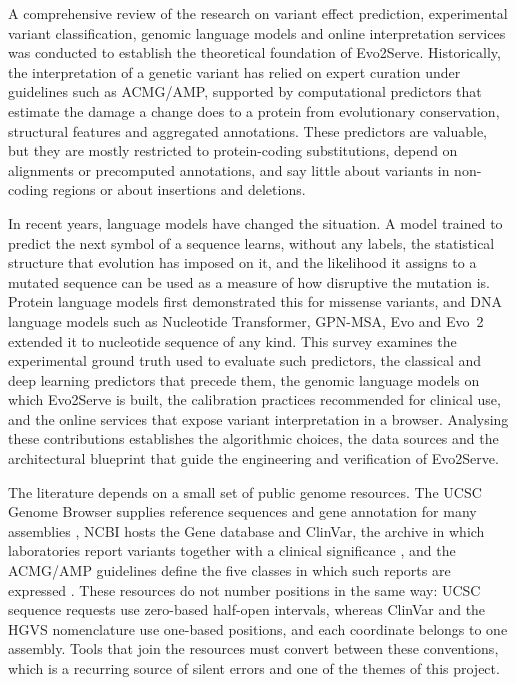 A comprehensive review of the research on variant effect prediction, experimental variant classification, genomic language models and online interpretation services was conducted to establish the theoretical foundation of Evo2Serve. Historically, the interpretation of a genetic variant has relied on expert curation under guidelines such as ACMG/AMP, supported by computational predictors that estimate the damage a change does to a protein from evolutionary conservation, structural features and aggregated annotations. These predictors are valuable, but they are mostly restricted to protein-coding substitutions, depend on alignments or precomputed annotations, and say little about variants in non-coding regions or about insertions and deletions.

In recent years, language models have changed the situation. A model trained to predict the next symbol of a sequence learns, without any labels, the statistical structure that evolution has imposed on it, and the likelihood it assigns to a mutated sequence can be used as a measure of how disruptive the mutation is. Protein language models first demonstrated this for missense variants, and DNA language models such as Nucleotide Transformer, GPN-MSA, Evo and Evo~2 extended it to nucleotide sequence of any kind. This survey examines the experimental ground truth used to evaluate such predictors, the classical and deep learning predictors that precede them, the genomic language models on which Evo2Serve is built, the calibration practices recommended for clinical use, and the online services that expose variant interpretation in a browser. Analysing these contributions establishes the algorithmic choices, the data sources and the architectural blueprint that guide the engineering and verification of Evo2Serve.

The literature depends on a small set of public genome resources. The UCSC Genome Browser supplies reference sequences and gene annotation for many assemblies \cite{lee2022ucsc}, NCBI hosts the Gene database and ClinVar, the archive in which laboratories report variants together with a clinical significance \cite{landrum2024clinvar}, and the ACMG/AMP guidelines define the five classes in which such reports are expressed \cite{richards2015acmg}. These resources do not number positions in the same way: UCSC sequence requests use zero-based half-open intervals, whereas ClinVar and the HGVS nomenclature use one-based positions, and each coordinate belongs to one assembly. Tools that join the resources must convert between these conventions, which is a recurring source of silent errors and one of the themes of this project.

